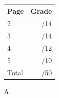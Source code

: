 \documentclass[12pt]{article}
\newcommand{\skipline}{\vspace{12pt}}
\begin{document}
\begin{table}[hbt]
\begin{center}
\begin{tabular}{|l|r|} \hline
Page&Grade\\
\hline \hline
\cline{1-2} 2 & \enspace\enspace\enspace\enspace\enspace\enspace/14\\
\cline{1-2} 3 & \enspace\enspace\enspace\enspace\enspace\enspace/14\\
\cline{1-2} 4 & \enspace\enspace\enspace\enspace\enspace\enspace/12\\
\cline{1-2} 5 & \enspace\enspace\enspace\enspace\enspace\enspace/10\\
\cline{1-2} Total & \enspace\enspace\enspace\enspace\enspace\enspace/50\\
\hline
\end{tabular}

\skipline

\skipline

\skipline

A
\end{center}
\end{table}
\newpage
\end{document}
